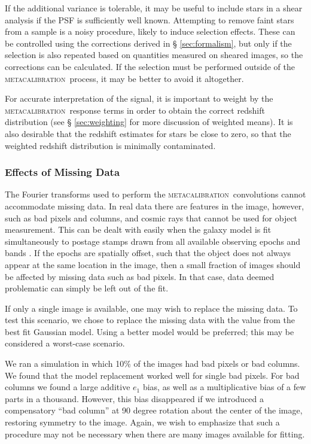 \documentclass[iop, twocolappendix, appendixfloats, numberedappendix, apj]{emulateapj}
\newcommand{\mcal}{\textsc{metacalibration}}
\begin{document}
If the additional variance is tolerable, it may be useful to include stars in a
shear analysis if the PSF is sufficiently well known.  Attempting to remove
faint stars from a sample is a noisy procedure, likely to induce selection
effects.  These can be controlled using the corrections derived in \S
\ref{sec:formalism}, but only if the selection is also repeated based on
quantities measured on sheared images, so the corrections can be calculated.
If the selection must be performed outside of the \mcal\ process, it may be
better to avoid it altogether.

For accurate interpretation of the signal, it is important to weight by the
\mcal\ response terms in order to obtain the correct redshift distribution (see \S
\ref{sec:weighting} for more discussion of weighted means).  It is also
desirable that the redshift estimates for stars be close to zero, so that the
weighted redshift distribution is minimally contaminated.






\subsubsection{Effects of Missing Data}

The Fourier transforms used to perform the \mcal\ convolutions cannot
accommodate missing data.  In real data there are features in the image,
however, such as bad pixels and columns, and cosmic rays that cannot be used
for object measurement.  This can be dealt with easily when the galaxy model is
fit simultaneously to postage stamps drawn from all available observing epochs
and bands \citep[e.g.][]{Jarvis2016}.  If the epochs are spatially offset, such
that the object does not always appear at the same location in the image, then
a small fraction of images should be affected by missing data such as bad
pixels.  In that case, data deemed problematic can simply be left out of the
fit.

If only a single image is available, one may wish to replace the missing data.
To test this scenario, we chose to replace the missing data with the value from
the best fit Gaussian model.  Using a better model would be preferred; this may
be considered a worst-case scenario.

We ran a simulation in which 10\% of the images had bad pixels or bad columns.
We found that the model replacement worked well for single bad pixels. For bad
columns we found a large additive $e_1$ bias, as well as a multiplicative bias
of a few parts in a thousand.  However, this bias disappeared if we introduced
a compensatory ``bad column'' at 90 degree rotation about the center of the
image, restoring symmetry to the image.   Again, we wish to emphasize that such
a procedure may not be necessary when there are many images available for
fitting.
\end{document}
